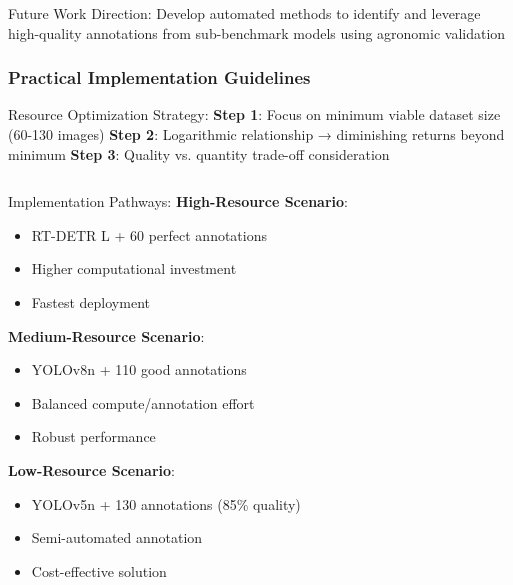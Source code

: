 \documentclass[aspectratio=43]{beamer}
\begin{document}
\begin{frame}
    \begin{alertblock}{Future Work Direction:}
        \small Develop automated methods to identify and leverage high-quality annotations from sub-benchmark models using agronomic validation
    \end{alertblock}
\end{frame}

\begin{frame}
    \frametitle{Practical Implementation Guidelines}
    
    \begin{block}{Resource Optimization Strategy:}
        \small
        \textbf{Step 1}: Focus on minimum viable dataset size (60-130 images)
        \textbf{Step 2}: Logarithmic relationship → diminishing returns beyond minimum
        \textbf{Step 3}: Quality vs. quantity trade-off consideration
    \end{block}
    
    \begin{columns}
        \begin{column}{0.5\textwidth}
            \begin{exampleblock}{Implementation Pathways:}
                \scriptsize
                \textbf{High-Resource Scenario}:
                \begin{itemize}
                    \item RT-DETR L + 60 perfect annotations
                    \item Higher computational investment
                    \item Fastest deployment
                \end{itemize}
                
                \textbf{Medium-Resource Scenario}:
                \begin{itemize}
                    \item YOLOv8n + 110 good annotations
                    \item Balanced compute/annotation effort
                    \item Robust performance
                \end{itemize}
                
                \textbf{Low-Resource Scenario}:
                \begin{itemize}
                    \item YOLOv5n + 130 annotations (85\% quality)
                    \item Semi-automated annotation
                    \item Cost-effective solution
                \end{itemize}
            \end{exampleblock}
        \end{column}
        

\end{columns}
\end{frame}
\end{document}
